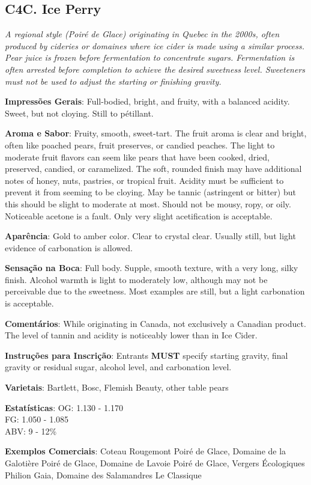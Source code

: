 \subsection*{C4C. Ice Perry}

\textit{A regional style (Poiré de Glace) originating in Quebec in the 2000s, often produced by cideries or domaines where ice cider is made using a similar process. Pear juice is frozen before fermentation to concentrate sugars. Fermentation is often arrested before completion to achieve the desired sweetness level. Sweeteners must not be used to adjust the starting or finishing gravity.}

\textbf{Impressões Gerais}: Full-bodied, bright, and fruity, with a balanced acidity. Sweet, but not cloying. Still to pétillant.

\textbf{Aroma e Sabor}: Fruity, smooth, sweet-tart. The fruit aroma is clear and bright, often like poached pears, fruit preserves, or candied peaches. The light to moderate fruit flavors can seem like pears that have been cooked, dried, preserved, candied, or caramelized. The soft, rounded finish may have additional notes of honey, nuts, pastries, or tropical fruit. Acidity must be sufficient to prevent it from seeming to be cloying. May be tannic (astringent or bitter) but this should be slight to moderate at most. Should not be mousy, ropy, or oily. Noticeable acetone is a fault. Only very slight acetification is acceptable.

\textbf{Aparência}: Gold to amber color. Clear to crystal clear. Usually still, but light evidence of carbonation is allowed.

\textbf{Sensação na Boca}: Full body. Supple, smooth texture, with a very long, silky finish. Alcohol warmth is light to moderately low, although may not be perceivable due to the sweetness. Most examples are still, but a light carbonation is acceptable.

\textbf{Comentários}: While originating in Canada, not exclusively a Canadian product. The level of tannin and acidity is noticeably lower than in Ice Cider.

\textbf{Instruções para Inscrição}: Entrants \textbf{MUST} specify starting gravity, final gravity or residual sugar, alcohol level, and carbonation level.

\textbf{Varietais}: Bartlett, Bosc, Flemish Beauty, other table pears

\textbf{Estatísticas}: OG: 1.130 - 1.170 \\
\phantom{ } \hspace{16.5mm} FG: 1.050 - 1.085 \\
\phantom{ } \hspace{16.5mm} ABV: 9 - 12\%

\textbf{Exemplos Comerciais}: Coteau Rougemont Poiré de Glace, Domaine de la Galotière Poiré de Glace, Domaine de Lavoie Poiré de Glace, Vergers Écologiques Philion Gaia, Domaine des Salamandres Le Classique